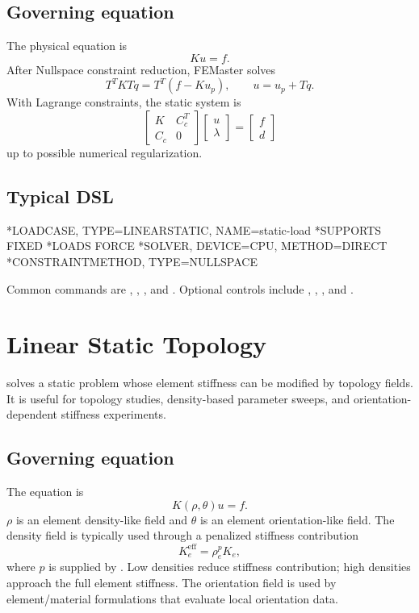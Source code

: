 \subsection{Governing equation}

The physical equation is
\[
K u = f .
\]
After Nullspace constraint reduction, FEMaster solves
\[
T^T K T q = T^T(f-Ku_p),
\qquad
u=u_p+Tq .
\]
With Lagrange constraints, the static system is
\[
\begin{bmatrix}
K & C_c^T\\
C_c & 0
\end{bmatrix}
\begin{bmatrix}
u\\
\lambda
\end{bmatrix}
=
\begin{bmatrix}
f\\
d
\end{bmatrix}
\]
up to possible numerical regularization.

\subsection{Typical DSL}

\begin{exampledeck}
*LOADCASE, TYPE=LINEARSTATIC, NAME=static-load
  *SUPPORTS
  FIXED
  *LOADS
  FORCE
  *SOLVER, DEVICE=CPU, METHOD=DIRECT
  *CONSTRAINTMETHOD, TYPE=NULLSPACE
\end{exampledeck}

Common commands are , , , and . Optional controls include , , , and .

\section{Linear Static Topology}
\label{sec:loadcase-linear-static-topo}

 solves a static problem whose element stiffness can be modified by topology fields. It is useful for topology studies, density-based parameter sweeps, and orientation-dependent stiffness experiments.

\subsection{Governing equation}

The equation is
\[
K(\rho,\theta)u=f .
\]
\(\rho\) is an element density-like field and \(\theta\) is an element orientation-like field. The density field is typically used through a penalized stiffness contribution
\[
K_e^\mathrm{eff} = \rho_e^p K_e ,
\]
where \(p\) is supplied by . Low densities reduce stiffness contribution; high densities approach the full element stiffness. The orientation field is used by element/material formulations that evaluate local orientation data.


